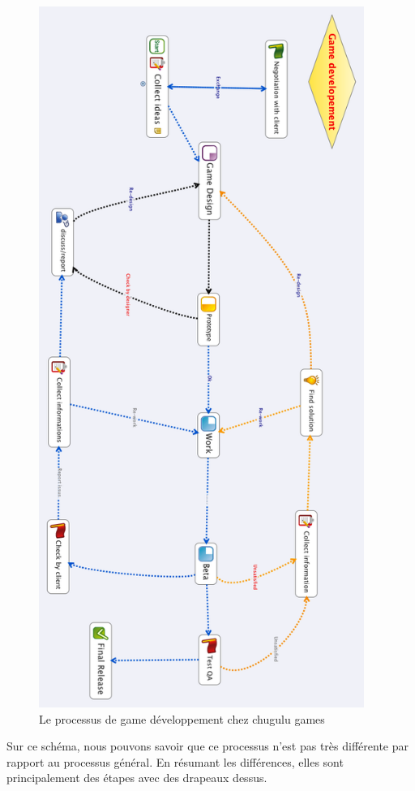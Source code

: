 \begin{figure}[htbp]
	\centering
		\includegraphics[height=9in]{XMinds/GamedevelopementChugulu.png}
	\caption{Le processus de game développement chez chugulu games}
	\label{fig:XMinds_GamedevelopementChugulu}
\end{figure}


Sur ce schéma, nous pouvons savoir que ce processus n'est pas très différente par rapport au processus général. En résumant les différences, elles sont principalement des étapes avec des drapeaux dessus. 


